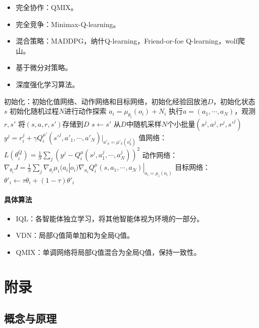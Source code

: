 \documentclass[
12pt, %
a4paper, 
oneside, %
headinclude,footinclude, %
]{scrartcl}
\begin{document}
\begin{itemize}
\item 完全协作：QMIX。
\item 完全竞争：Minimax-Q-learning。
\item 混合策略：MADDPG，纳什Q-learning，Friend-or-foe Q-learning，wolf爬山。
\item 基于微分对策略。
\item 深度强化学习算法。
\end{itemize}
\begin{myalgorithm}[MADDPG]
\State 初始化：初始化值网络、动作网络和目标网络，初始化经验回放池$ D $，初始化状态$ s $
\State 初始化随机过程$ N $进行动作探索
\State $ a_i = \mu_{\theta_i}(o_i) + N_i $ 
\State 执行$ a = (a_1, \cdots, a_N) $，观测$ r, s' $
\State 将$ (s, a, r, s')$存储到$ D $
\State $ s \leftarrow s'$
\State 从$ D $中随机采样$ N $个小批量$ (s^j, a^j, r^j, s'^j) $
\State $ y^j = r_i^j + \gamma Q_i^{\mu'}(s'^j, a'_1, \cdots, a'_N)|_{a'_k = \mu'_k(o_k^j)} $ 
\State 值网络：$ L(\theta_i^Q) = \frac{1}{S}\sum_j(y^j - Q_i^{\mu}(s^j, a_1^j, \cdots, a_N^j))^2 $ 
\State 动作网络：$ \nabla_{\theta_i}J = \frac{1}{S}\sum_j \nabla_{\theta_i}\mu_i(a_i|o_i)\nabla_{a_i}Q_i^{\mu}(s, a_1, \cdots, a_N)|_{a_i = \mu_i(o_i)}$ 
\State 目标网络：$ \theta'_i \leftarrow \tau \theta_i + (1 - \tau)\theta'_i $
\EndFor
\EndFor
\EndFor
\end{myalgorithm}
\paragraph{具体算法}
\begin{itemize}
\item IQL：各智能体独立学习，将其他智能体视为环境的一部分。
\item VDN：局部Q值简单加和为全局Q值。
\item QMIX：单调网络将局部Q值混合为全局Q值，保持一致性。
\end{itemize}
\section{附录}
\subsection[概念与原理]{概念与原理}
\end{document}
